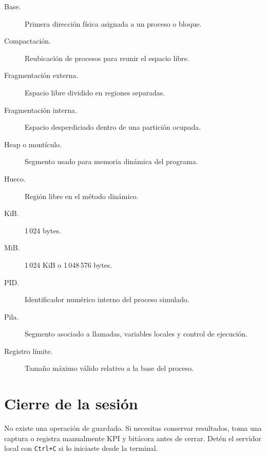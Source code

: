 \documentclass[11pt,a4paper]{article}
\begin{document}
\begin{description}
  \item[Base.] Primera dirección física asignada a un proceso o bloque.
  \item[Compactación.] Reubicación de procesos para reunir el espacio libre.
  \item[Fragmentación externa.] Espacio libre dividido en regiones separadas.
  \item[Fragmentación interna.] Espacio desperdiciado dentro de una partición ocupada.
  \item[Heap o montículo.] Segmento usado para memoria dinámica del programa.
  \item[Hueco.] Región libre en el método dinámico.
  \item[KiB.] 1\,024 bytes.
  \item[MiB.] 1\,024 KiB o 1\,048\,576 bytes.
  \item[PID.] Identificador numérico interno del proceso simulado.
  \item[Pila.] Segmento asociado a llamadas, variables locales y control de ejecución.
  \item[Registro límite.] Tamaño máximo válido relativo a la base del proceso.
\end{description}

\section{Cierre de la sesión}

No existe una operación de guardado. Si necesitas conservar resultados, toma una
captura o registra manualmente KPI y bitácora antes de cerrar. Detén el servidor
local con \texttt{Ctrl+C} si lo iniciaste desde la terminal.
\end{document}

